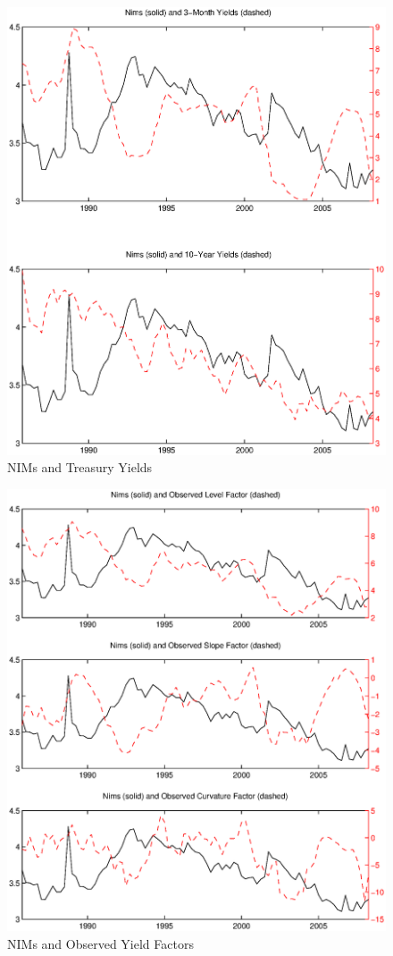 \documentclass[12pt]{article}
\begin{document}
\begin{figure}[tbp]
\caption{NIMs and Treasury Yields} \label{figure_nims_rates}
\center
\includegraphics[scale=0.85]{figure_nims_rates.ps}
\end{figure}

\begin{figure}[tbp]
\caption{NIMs and Observed Yield Factors} \label{figure_nims_factors}
\center
\includegraphics[scale=0.85]{figure_nims_factors.ps}
\end{figure}
\end{document}
